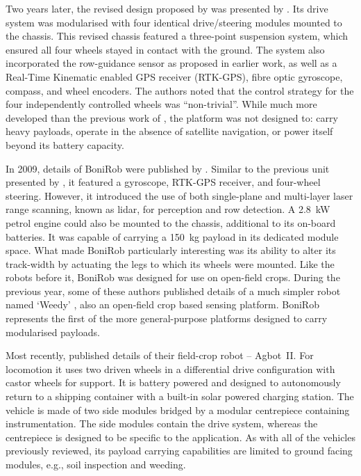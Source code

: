 \documentclass[preprint,authoryear,12pt]{elsarticle}
\begin{document}
        Two years later, the revised design proposed by \cite{Pedersen2002} was presented by \cite{Bak2004}.
        Its drive system was modularised with four identical drive/steering modules mounted to the chassis.
        This revised chassis featured a three-point suspension system, which ensured all four wheels stayed in contact with the ground.
        The system also incorporated the row-guidance sensor as proposed in earlier work, as well as a Real-Time Kinematic enabled GPS receiver (RTK-GPS), fibre optic gyroscope, compass, and wheel encoders.
        The authors noted that the control strategy for the four independently controlled wheels was ``non-trivial''.
        While much more developed than the previous work of \cite{Pedersen2002}, the platform was not designed to: carry heavy payloads, operate in the absence of satellite navigation, or power itself beyond its battery capacity.

        In 2009, details of BoniRob were published by \cite{Ruckelshausen2009}.
        Similar to the previous unit presented by \cite{Bak2004}, it featured a gyroscope, RTK-GPS receiver, and four-wheel steering.
        However, it introduced the use of both single-plane and multi-layer laser range scanning, known as lidar, for perception and row detection.
        A \SI{2.8}{\kilo\watt} petrol engine could also be mounted to the chassis, additional to its on-board batteries.
        It was capable of carrying a \SI{150}{\kilo\gram} payload in its dedicated module space.
        What made BoniRob particularly interesting was its ability to alter its track-width by actuating the legs to which its wheels were mounted.
        Like the robots before it, BoniRob was designed for use on open-field crops.
        During the previous year, some of these authors published details of a much simpler robot named `Weedy' \citep{Klose2008}, also an open-field crop based sensing platform.
        BoniRob represents the first of the more general-purpose platforms designed to carry modularised payloads.

        Most recently, \cite{Bawden2017} published details of their field-crop robot -- Agbot~II.
        For locomotion it uses two driven wheels in a differential drive configuration with castor wheels for support.
        It is battery powered and designed to autonomously return to a shipping container with a built-in solar powered charging station.
        The vehicle is made of two side modules bridged by a modular centrepiece containing instrumentation.
        The side modules contain the drive system, whereas the centrepiece is designed to be specific to the application.
        As with all of the vehicles previously reviewed, its payload carrying capabilities are limited to ground facing modules, e.g., soil inspection and weeding.
\end{document}
